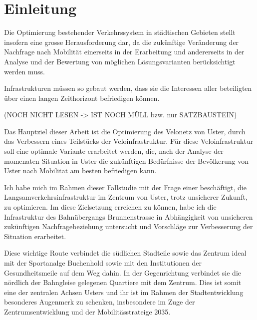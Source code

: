 %
%            
%
%
%

\chapter{Einleitung}
\label{chap:Einleitung}

Die Optimierung bestehender Verkehrssystem in städtischen Gebieten stellt insofern eine grosse Herausforderung dar, da die zukünftige Veränderung der Nachfrage nach Mobilität einerseits in der Erarbeitung und andererseits in der Analyse und der Bewertung von möglichen Lösungsvarianten berücksichtigt werden muss. 

Infrastrukturen müssen so gebaut werden, dass sie die Interessen aller beteiligten über einen langen Zeithorizont befriedigen können.

(NOCH NICHT LESEN -> IST NOCH MÜLL bzw. nur SATZBAUSTEIN)


Das Hauptziel dieser Arbeit ist die Optimierung des Velonetz von Uster, durch das Verbessern eines Teilstücks der Veloinfrastruktur. Für diese Veloinfrastruktur soll eine optimale Variante erarbeitet werden, die, nach der Analyse der momenaten Situation in Uster die zukünftigen Bedürfnisse der Bevölkerung von Uster nach Mobilitat am besten befriedigen kann. 

Ich habe mich im Rahmen dieser Fallstudie mit der Frage einer beschäftigt, die Langsamverkehrsinfrastruktur im Zentrum von Uster, trotz unsicherer Zukunft, zu optimieren. Im diese Zielsetzung erreichen zu können, habe ich die Infrastruktur des Bahnübergangs Brunnenstrasse in Abhängigkeit von unsicheren zukünftigen Nachfragebeziehung untersucht und Vorschläge zur Verbesserung der Situation erarbeitet.

Diese wichtige Route verbindet die südlichen Stadteile sowie das Zentrum ideal mit der Sportanalge Buchenhold sowie mit den Institutionen der Gesundheitsmeile auf dem Weg dahin. In der Gegenrichtung verbindet sie die nördlich der Bahngleise gelegenen Quartiere mit dem Zentrum. Dies ist somit eine der zentralen Achsen Usters und ihr ist im Rahmen der Stadtentwicklung besonderes Augenmerk zu schenken, insbesondere im Zuge der Zentrumsentwicklung und der Mobilitässtrateige 2035. 



 



%

